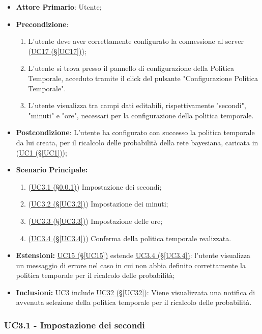 \begin{itemize}
	\item \textbf{Attore Primario}: Utente;
	\item \textbf{Precondizione}:
		\begin{enumerate}
			\item L'utente deve aver correttamente configurato la connessione al server (\hyperref[UC17]{UC17 (§\ref*{UC17})});
			\item L'utente si trova presso il pannello di configurazione della Politica Temporale, acceduto tramite il click del pulsante "Configurazione Politica Temporale".
			\item L'utente visualizza tra campi dati editabili, rispettivamente "secondi", "minuti" e "ore", necessari per la configurazione della politica temporale.
		\end{enumerate}
	\item \textbf{Postcondizione}: L'utente ha configurato con successo la politica temporale da lui creata, per il ricalcolo delle probabilità della rete bayesiana, caricata in (\hyperref[UC1]{UC1 (§\ref*{UC1})});
	\item \textbf{Scenario Principale:}
	\begin{enumerate}
		\item (\hyperref[UC3.1]{UC3.1 (§\ref*{UC3.1})}) Impostazione dei secondi;
		\item (\hyperref[UC3.2]{UC3.2 (§\ref*{UC3.2})}) Impostazione dei minuti;
		\item (\hyperref[UC3.3]{UC3.3 (§\ref*{UC3.3})}) Impostazione delle ore;
		\item (\hyperref[UC3.4]{UC3.4 (§\ref*{UC3.4})}) Conferma della politica temporale realizzata.
	\end{enumerate}
	\item \textbf{Estensioni:} \hyperref[UC15]{UC15 (§\ref*{UC15})} estende \hyperref[UC3.4]{UC3.4 (§\ref*{UC3.4})}: l'utente visualizza un messaggio di errore nel caso in cui non abbia definito correttamente la politica temporale per il ricalcolo delle probabilità;
	\item \textbf{Inclusioni:} UC3 include \hyperref[UC32]{UC32 (§\ref*{UC32})}: Viene visualizzata una notifica di avvenuta selezione della politica temporale per il ricalcolo delle probabilità.
\end{itemize}

\pagebreak

\subsubsection{UC3.1 - Impostazione dei secondi}\label{UC3.1}

